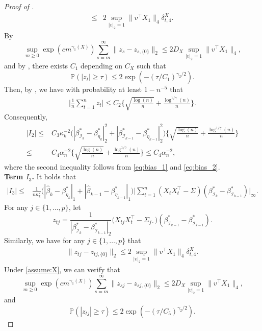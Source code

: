 \documentclass[11pt]{article}
\newcommand{\p}{\mathbb P}
\theoremstyle{plain}
\theoremstyle{definition}
\begin{document}
\begin{proof}[Proof of ]
\begin{align*}
    \leq& 2\sup_{|v|_2 = 1}\big\|v^{\top}X_1\big\|_{4}\delta^X_{t,4}.
\end{align*}
By  $$\sup_{m \geq 0}\exp(cm^{\gamma_1(X)})\sum_{s = m}^{\infty}\big\|z_s - z_{s,\{0\}}\big\|_2 \leq 2D_X\sup_{|v|_2 = 1}\big\|v^{\top}X_1\big\|_{4},$$
and by ,  there exists $C_1$  depending on $C_X$ such that
 $$\p ( |z_t| \ge \tau) \le 2 \exp(- (\tau/C_1)^ {\gamma_2/2}).$$
Then, by , we have with probability at least $1 - n^{-5}$ that
\begin{align*}
  \bigg | \frac{1}{n}\sum_{t=1}^n z_t  \bigg |  \le  C_2 \bigg\{  \sqrt { \frac{\log(n) }{n}  }  +   \frac{ \log^{1/\gamma }( n) }{n} \bigg \}.
\end{align*}
Consequently,
\begin{align*}
    |I_2| \leq& C_3\kappa_k^{-2}\big( |\beta^*_{\mathcal{I}_{k}} - \beta^*_{\eta_{k}}|_2^2 + |\beta^*_{\mathcal{I}_{k-1}} - \beta^*_{\eta_{k-1}}|_2^2\big)\bigg\{  \sqrt { \frac{\log(n) }{n}  }  +   \frac{ \log^{1/\gamma }( n) }{n} \bigg \}\\
    \leq& C_4\alpha_n^{-2}\bigg\{  \sqrt { \frac{\log(n) }{n}  }  +   \frac{ \log^{1/\gamma }( n) }{n} \bigg \} \leq C_4\alpha_n^{-2},
\end{align*}
where the second inequality follows from \eqref{eq:bias_1} and \eqref{eq:bias_2}.
\
\\
\textbf{Term $I_3$.} It holds that 
\begin{align*}
    |I_3| \leq& \frac{1}{n\kappa_k^2}\big(|\widehat{\beta}_{k} - \beta_{\eta_k}^*|_1 +  |\widehat{\beta}_{k-1} - \beta_{\eta_{k-1}}^*|_1\big) \bigg|\sum_{t = 1}^n(X_tX_t^{\top} - \Sigma)(\beta_{\mathcal{I}_k}^* - \beta_{\mathcal{I}_{k-1}}^*)\bigg|_{\infty}.
\end{align*}
For any $j \in \{1, \dots, p\}$, let $$z_{tj} = \frac{1}{|\beta^*_{\mathcal{I}_{k}} - \beta^*_{\mathcal{I}_{k-1}}|_2}\big(X_{tj}X_t^{\top} - \Sigma_{j\cdot}\big)(\beta^*_{\mathcal{I}_{k-1}} - \beta^*_{\mathcal{I}_{k-1}}).$$
Similarly, we have for any $j \in \{1, \dots, p\}$ that
\begin{align*}
    \big\|z_{tj} - z_{tj,\{0\}}\big\|_2 \leq 2\sup_{|v|_2 = 1}\big\|v^{\top}X_1\big\|_{4}\delta^X_{t,4}.
\end{align*}
Under \cref{assume:X}, we can verify that
$$\sup_{m \geq 0}\exp(cm^{\gamma_1(X)})\sum_{s = m}^{\infty}\big\|z_{sj} - z_{sj,\{0\}}\big\|_2 \leq 2D_X\sup_{|v|_2 = 1}\big\|v^{\top}X_1\big\|_{4},$$
and 
 $$\p ( |z_{tj}| \ge \tau) \le 2 \exp(- (\tau/C_5)^ {\gamma_2/2}).$$

\end{proof}
\end{document}
